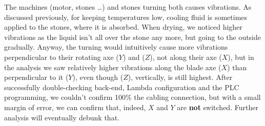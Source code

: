 The machines (motor, stones \dots) and stones turning both causes vibrations. As discussed previously, for keeping temperatures low, cooling fluid is sometimes applied to the stones, 
where it is absorbed. When drying, we noticed higher vibrations as the liquid isn't all over the stone any more, but going to the outside gradually.
Anyway, the turning would intuitively cause more vibrations perpendicular to their rotating axe ($Y$) and ($Z$), not along their axe ($X$), 
but in the analysis we saw relatively higher vibrations along the blade axe ($X$) than perpendicular to it ($Y$), even though ($Z$), vertically, is still highest. 
After successfully double-checking back-end, Lambda configuration and the \ac{PLC} programming, we couldn't confirm 100\% the cabling connection, but with a small margin of 
error, we can confirm that, indeed, $X$ and $Y$ are \textbf{not} switched. Further analysis will eventually debunk that. 


